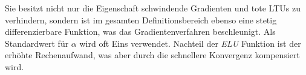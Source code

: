 Sie besitzt nicht nur die Eigenschaft schwindende Gradienten und tote LTUs zu verhindern, sondern ist im gesamten Definitionsbereich ebenso eine stetig differenzierbare Funktion, was das Gradientenverfahren beschleunigt. Als Standardwert für $\alpha$ wird oft Eins verwendet. Nachteil der \textit{ELU} Funktion ist der erhöhte Rechenaufwand, was aber durch die schnellere Konvergenz kompensiert wird. \cite{AurelienGeron.2018}

